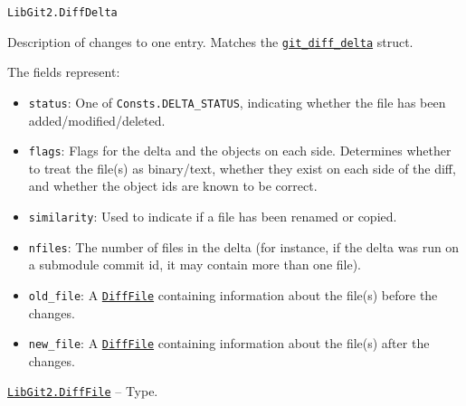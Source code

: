 \begin{adjustwidth}{2em}{0pt}


\begin{verbatim}
LibGit2.DiffDelta
\end{verbatim}

Description of changes to one entry. Matches the \href{https://libgit2.org/libgit2/\#HEAD/type/git\_diff\_delta}{\texttt{git\_diff\_delta}} struct.

The fields represent:

\begin{itemize}
\item \texttt{status}: One of \texttt{Consts.DELTA\_STATUS}, indicating whether the file has been added/modified/deleted.


\item \texttt{flags}: Flags for the delta and the objects on each side. Determines whether to treat the file(s)  as binary/text, whether they exist on each side of the diff, and whether the object ids are known  to be correct.


\item \texttt{similarity}: Used to indicate if a file has been renamed or copied.


\item \texttt{nfiles}: The number of files in the delta (for instance, if the delta  was run on a submodule commit id, it may contain more than one file).


\item \texttt{old\_file}: A \hyperlink{18417152281461649554}{\texttt{DiffFile}} containing information about the file(s) before the changes.


\item \texttt{new\_file}: A \hyperlink{18417152281461649554}{\texttt{DiffFile}} containing information about the file(s) after the changes.

\end{itemize}


\end{adjustwidth}
\hypertarget{18417152281461649554}{}
\hyperlink{18417152281461649554}{\texttt{LibGit2.DiffFile}}  -- {Type.}

